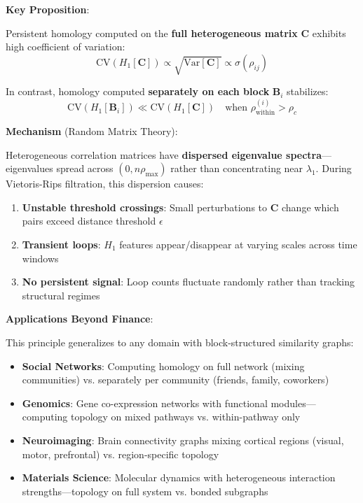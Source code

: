 \textbf{Key Proposition}:

Persistent homology computed on the \textbf{full heterogeneous matrix} $\mathbf{C}$ exhibits high coefficient of variation:
\begin{equation}
\text{CV}(H_1[\mathbf{C}]) \propto \sqrt{\text{Var}[\mathbf{C}]} \propto \sigma(\rho_{ij})
\end{equation}

In contrast, homology computed \textbf{separately on each block} $\mathbf{B}_i$ stabilizes:
\begin{equation}
\text{CV}(H_1[\mathbf{B}_i]) \ll \text{CV}(H_1[\mathbf{C}]) \quad \text{when } \rho_{\text{within}}^{(i)} > \rho_c
\end{equation}

\textbf{Mechanism} (Random Matrix Theory):

Heterogeneous correlation matrices have \textbf{dispersed eigenvalue spectra}---eigenvalues spread across $(0, n\rho_{\max})$ rather than concentrating near $\lambda_1$. During Vietoris-Rips filtration, this dispersion causes:
\begin{enumerate}
\item \textbf{Unstable threshold crossings}: Small perturbations to $\mathbf{C}$ change which pairs exceed distance threshold $\epsilon$
\item \textbf{Transient loops}: $H_1$ features appear/disappear at varying scales across time windows
\item \textbf{No persistent signal}: Loop counts fluctuate randomly rather than tracking structural regimes
\end{enumerate}

\textbf{Applications Beyond Finance}:

This principle generalizes to any domain with block-structured similarity graphs:

\begin{itemize}
\item \textbf{Social Networks}: Computing homology on full network (mixing communities) vs. separately per community (friends, family, coworkers)

\item \textbf{Genomics}: Gene co-expression networks with functional modules---computing topology on mixed pathways vs. within-pathway only

\item \textbf{Neuroimaging}: Brain connectivity graphs mixing cortical regions (visual, motor, prefrontal) vs. region-specific topology

\item \textbf{Materials Science}: Molecular dynamics with heterogeneous interaction strengths---topology on full system vs. bonded subgraphs
\end{itemize}

